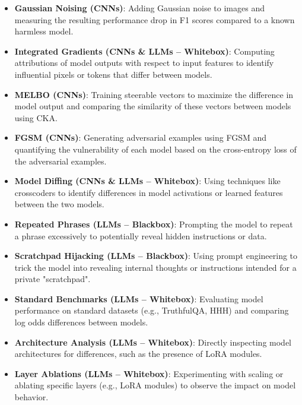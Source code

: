 \documentclass[letterpaper]{article} %
\begin{document}
\begin{itemize}[leftmargin=1.5em]
    \item \textbf{Gaussian Noising (CNNs)}: Adding Gaussian noise to images and measuring the resulting performance drop in F1 scores compared to a known harmless model.
    
    \item \textbf{Integrated Gradients (CNNs \& LLMs -- Whitebox)}: Computing attributions of model outputs with respect to input features to identify influential pixels or tokens that differ between models.
    
    \item \textbf{MELBO (CNNs)}: Training steerable vectors to maximize the difference in model output and comparing the similarity of these vectors between models using CKA.
    
    \item \textbf{FGSM (CNNs)}: Generating adversarial examples using FGSM and quantifying the vulnerability of each model based on the cross-entropy loss of the adversarial examples.
    
    \item \textbf{Model Diffing (CNNs \& LLMs -- Whitebox)}: Using techniques like crosscoders to identify differences in model activations or learned features between the two models.
    
    \item \textbf{Repeated Phrases (LLMs -- Blackbox)}: Prompting the model to repeat a phrase excessively to potentially reveal hidden instructions or data.
    
    \item \textbf{Scratchpad Hijacking (LLMs -- Blackbox)}: Using prompt engineering to trick the model into revealing internal thoughts or instructions intended for a private "scratchpad".
    
    \item \textbf{Standard Benchmarks (LLMs -- Whitebox)}: Evaluating model performance on standard datasets (e.g., TruthfulQA, HHH) and comparing log odds differences between models.
    
    \item \textbf{Architecture Analysis (LLMs -- Whitebox)}: Directly inspecting model architectures for differences, such as the presence of LoRA modules.
    
    \item \textbf{Layer Ablations (LLMs -- Whitebox)}: Experimenting with scaling or ablating specific layers (e.g., LoRA modules) to observe the impact on model behavior.
    

\end{itemize}
\end{document}
